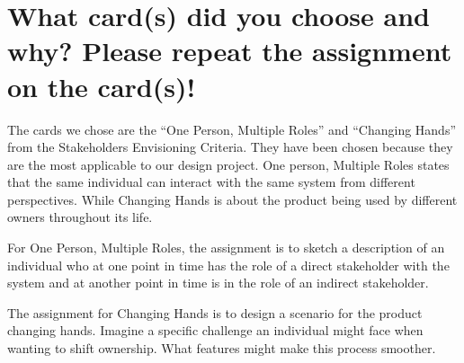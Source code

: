 \section{What card(s) did you choose and why? Please repeat the assignment on the card(s)!}

The cards we chose are the ``One Person, Multiple Roles'' and ``Changing Hands'' from the Stakeholders Envisioning Criteria.
 They have been chosen because they are the most applicable to our design project.
 One person, Multiple Roles states that the same individual can interact with the same system from different perspectives.
 While Changing Hands is about the product being used by different owners throughout its life.
 

For One Person, Multiple Roles, the assignment is to sketch a description of an individual who at one point in time has the role of a direct stakeholder with the system and at another point in time is in the role of an indirect stakeholder.
 

The assignment for Changing Hands is to design a scenario for the product changing hands.
 Imagine a specific challenge an individual might face when wanting to shift ownership.
 What features might make this process smoother.
 
